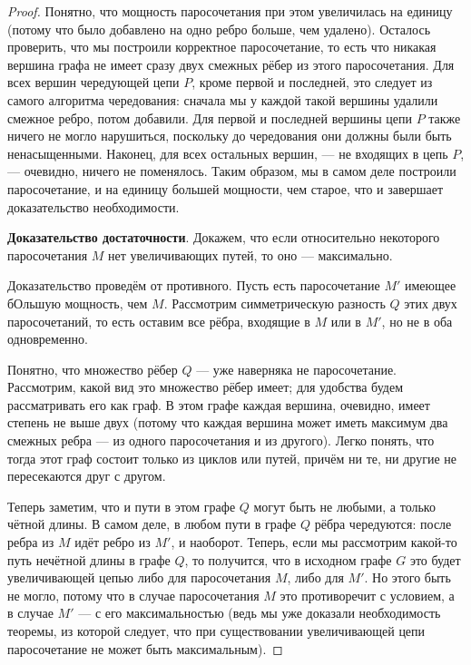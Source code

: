 \begin{solution}
\begin{proof}
Понятно, что мощность паросочетания при этом увеличилась на единицу (потому что было добавлено на одно ребро больше, чем удалено). Осталось проверить, что мы построили корректное паросочетание, то есть что никакая вершина графа не имеет сразу двух смежных рёбер из этого паросочетания. Для всех вершин чередующей цепи $P$, кроме первой и последней, это следует из самого алгоритма чередования: сначала мы у каждой такой вершины удалили смежное ребро, потом добавили. Для первой и последней вершины цепи $P$ также ничего не могло нарушиться, поскольку до чередования они должны были быть ненасыщенными. Наконец, для всех остальных вершин, — не входящих в цепь $P$, — очевидно, ничего не поменялось. Таким образом, мы в самом деле построили паросочетание, и на единицу большей мощности, чем старое, что и завершает доказательство необходимости.\par

\textbf{Доказательство достаточности}. Докажем, что если относительно некоторого паросочетания $M$ нет увеличивающих путей, то оно — максимально.\par

Доказательство проведём от противного. Пусть есть паросочетание $M'$ имеющее бОльшую мощность, чем $M$. Рассмотрим симметрическую разность $Q$ этих двух паросочетаний, то есть оставим все рёбра, входящие в $M$ или в $M'$, но не в оба одновременно.\par

Понятно, что множество рёбер $Q$ — уже наверняка не паросочетание. Рассмотрим, какой вид это множество рёбер имеет; для удобства будем рассматривать его как граф. В этом графе каждая вершина, очевидно, имеет степень не выше двух (потому что каждая вершина может иметь максимум два смежных ребра — из одного паросочетания и из другого). Легко понять, что тогда этот граф состоит только из циклов или путей, причём ни те, ни другие не пересекаются друг с другом.\par

Теперь заметим, что и пути в этом графе $Q$ могут быть не любыми, а только чётной длины. В самом деле, в любом пути в графе $Q$ рёбра чередуются: после ребра из $M$ идёт ребро из $M'$, и наоборот. Теперь, если мы рассмотрим какой-то путь нечётной длины в графе $Q$, то получится, что в исходном графе $G$ это будет увеличивающей цепью либо для паросочетания $M$, либо для $M'$. Но этого быть не могло, потому что в случае паросочетания $M$ это противоречит с условием, а в случае $M'$ — с его максимальностью (ведь мы уже доказали необходимость теоремы, из которой следует, что при существовании увеличивающей цепи паросочетание не может быть максимальным).\par


\end{proof}
\end{solution}

